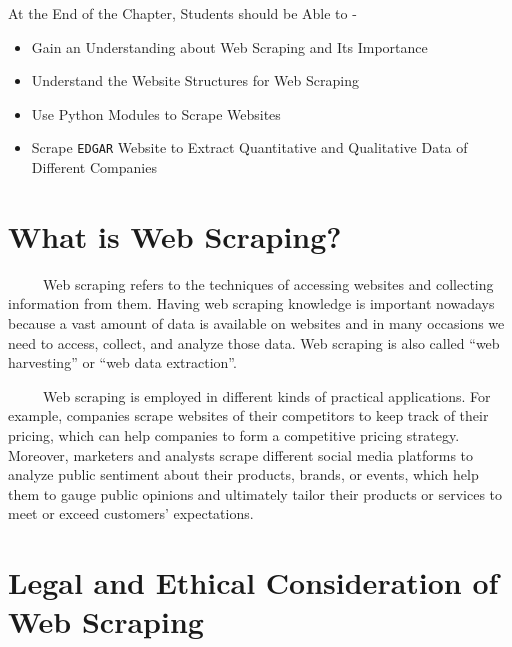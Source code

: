 \documentclass[
  letterpaper,
  DIV=11,
  numbers=noendperiod]{scrreprt}
\begin{document}
\begin{tcolorbox}[enhanced jigsaw, arc=.35mm, bottomrule=.15mm, bottomtitle=1mm, breakable, colback=white, colbacktitle=quarto-callout-note-color!10!white, colframe=quarto-callout-note-color-frame, coltitle=black, left=2mm, leftrule=.75mm, opacityback=0, opacitybacktitle=0.6, rightrule=.15mm, title=\textcolor{quarto-callout-note-color}{\faInfo}\hspace{0.5em}{Learning Objectives}, titlerule=0mm, toprule=.15mm, toptitle=1mm]

At the End of the Chapter, Students should be Able to -

\begin{itemize}
\item
  Gain an Understanding about Web Scraping and Its Importance
\item
  Understand the Website Structures for Web Scraping
\item
  Use Python Modules to Scrape Websites
\item
  Scrape \texttt{EDGAR} Website to Extract Quantitative and Qualitative
  Data of Different Companies
\end{itemize}

\end{tcolorbox}

\section{What is Web Scraping?}\label{what-is-web-scraping}

~~~~~Web scraping refers to the techniques of accessing websites and
collecting information from them. Having web scraping knowledge is
important nowadays because a vast amount of data is available on
websites and in many occasions we need to access, collect, and analyze
those data. Web scraping is also called ``web harvesting'' or ``web data
extraction''.

~~~~~Web scraping is employed in different kinds of practical
applications. For example, companies scrape websites of their
competitors to keep track of their pricing, which can help companies to
form a competitive pricing strategy. Moreover, marketers and analysts
scrape different social media platforms to analyze public sentiment
about their products, brands, or events, which help them to gauge public
opinions and ultimately tailor their products or services to meet or
exceed customers' expectations.

\section{Legal and Ethical Consideration of Web
Scraping}\label{legal-and-ethical-consideration-of-web-scraping}
\end{document}
